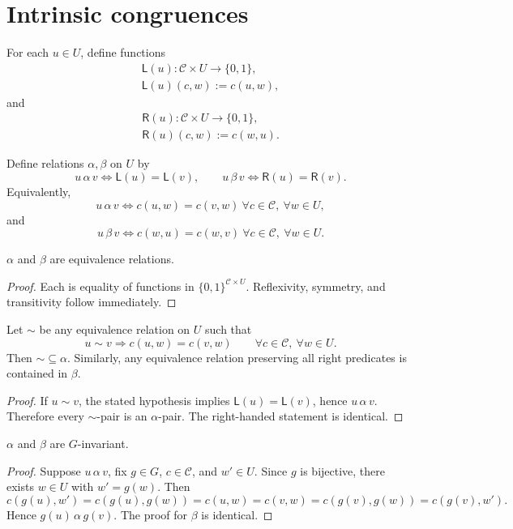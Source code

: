 \section{Intrinsic congruences}
\begin{definition}
	\label{def:left-right-profiles}
	For each \(u\in U\), define functions
	\[
		\begin{split}
			\mathsf L(u):\mathcal C\times U\to\{0,1\}, \\
			\mathsf L(u)(c,w):=c(u,w),
		\end{split}
	\]
	and
	\[
		\begin{split}
			\mathsf R(u):\mathcal C\times U\to\{0,1\}, \\
			\mathsf R(u)(c,w):=c(w,u).
		\end{split}
	\]
\end{definition}
\begin{definition}
	\label{def:alpha-beta}
	Define relations \(\alpha,\beta\) on \(U\) by
	\[
		u\,\alpha\,v
		\iff
		\mathsf L(u)=\mathsf L(v),
		\qquad
		u\,\beta\,v
		\iff
		\mathsf R(u)=\mathsf R(v).
	\]
	Equivalently,
	\[
		u\,\alpha\,v
		\iff
		c(u,w)=c(v,w)\ \forall c\in\mathcal C,\ \forall w\in U,
	\]
	and
	\[
		u\,\beta\,v
		\iff
		c(w,u)=c(w,v)\ \forall c\in\mathcal C,\ \forall w\in U.
	\]
\end{definition}
\begin{lemma}
	\(\alpha\) and \(\beta\) are equivalence relations.
\end{lemma}
\begin{proof}
	Each is equality of functions in \(\{0,1\}^{\mathcal C\times U}\).
	Reflexivity, symmetry, and transitivity follow immediately.
\end{proof}
\begin{lemma}
	Let \(\sim\) be any equivalence relation on \(U\) such that
	\[
		u\sim v
		\Longrightarrow
		c(u,w)=c(v,w)
		\qquad
		\forall c\in\mathcal C,\ \forall w\in U.
	\]
	Then \(\sim\subseteq\alpha\). Similarly, any equivalence relation
	preserving all right predicates is contained in \(\beta\).
\end{lemma}
\begin{proof}
	If \(u\sim v\), the stated hypothesis implies
	\(\mathsf L(u)=\mathsf L(v)\), hence \(u\,\alpha\,v\).
	Therefore every \(\sim\)-pair is an \(\alpha\)-pair.
	The right-handed statement is identical.
\end{proof}
\begin{lemma}[Invariance]
	\label{lem:invariance}
	\(\alpha\) and \(\beta\) are \(G\)-invariant.
\end{lemma}
\begin{proof}
	Suppose \(u\,\alpha\,v\), fix \(g\in G\), \(c\in\mathcal C\), and
	\(w'\in U\). Since \(g\) is bijective, there exists \(w\in U\) with
	\(w'=g(w)\). Then
	\[
		c(g(u),w')
		=
		c(g(u),g(w))
		=
		c(u,w)
		=
		c(v,w)
		=
		c(g(v),g(w))
		=
		c(g(v),w').
	\]
	Hence \(g(u)\,\alpha\,g(v)\). The proof for \(\beta\) is identical.
\end{proof}
